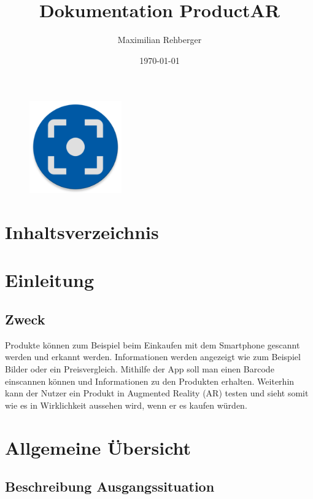 \documentclass{scrartcl}
\title{Dokumentation ProductAR}
\author{Maximilian Rehberger}
\date{\today}
\begin{document}
\maketitle

\begin{figure}[h]
\centering
\includegraphics[width=150px]{img/app_icon.png}
\end{figure}



\newpage


\renewcommand*\contentsname{}
\section{Inhaltsverzeichnis}
\tableofcontents{}


\newpage

\section{Einleitung}

\subsection{Zweck}

Produkte können zum Beispiel beim Einkaufen mit dem Smartphone gescannt werden und erkannt werden. Informationen werden angezeigt wie zum Beispiel Bilder oder ein Preisvergleich. Mithilfe der App soll man einen Barcode einscannen können und Informationen zu den Produkten erhalten. Weiterhin kann der Nutzer ein Produkt in Augmented Reality (AR) testen und sieht somit wie es in Wirklichkeit aussehen wird, wenn er es kaufen würden.

\newpage

\section{Allgemeine Übersicht}

\subsection{Beschreibung Ausgangssituation}
\end{document}

